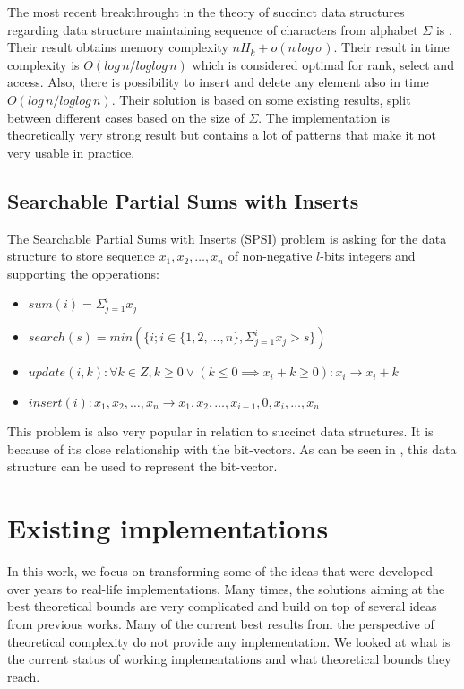 The most recent breakthrought in the theory of succinct data structures regarding data structure maintaining sequence of characters from alphabet $\Sigma$ is \cite{munro2015compressed}. Their result obtains memory complexity $nH_k+o(n\,log\,\sigma)$. Their result in time complexity is $O(log\,n/log log\,n)$ which is considered optimal for rank, select and access. Also, there is possibility to insert and delete any element also in time $O(log\,n/log log\,n)$. Their solution is based on some existing results, split between different cases based on the size of $\Sigma$. The implementation is theoretically very strong result but contains a lot of patterns that make it not very usable in practice.

\subsection{Searchable Partial Sums with Inserts}

\begin{theorem}
The Searchable Partial Sums with Inserts (SPSI) problem is asking for the data structure to
store sequence $x_1, x_2, \ldots , x_n$ of non-negative $l$-bits integers and supporting the opperations:
\begin{itemize}
    \item $sum(i) = \Sigma_{j=1}^{i} x_j$
    \item $search(s) = min(\{i; i\in \{1, 2,\ldots, n\}, \Sigma_{j=1}^{i} x_j > s \})$
    \item $update(i, k): \forall k \in Z, k \geq 0 \lor (k\leq 0 \implies x_i + k \geq 0): x_i \rightarrow x_i + k$
    \item $insert(i): x_1, x_2,\ldots, x_n \rightarrow x_1, x_2,\ldots , x_{i-1}, 0, x_{i}, \ldots , x_n$
\end{itemize}
\end{theorem}

This problem is also very popular in relation to succinct data structures. It is because of its close relationship with the bit-vectors.
As can be seen in \cite{prezza2017framework}, this data structure can be used to represent the bit-vector.

\section{Existing implementations}

In this work, we focus on transforming some of the ideas that were developed over years to real-life implementations. Many times, the solutions aiming at the best theoretical bounds are very complicated and build on top of several ideas from previous works. Many of the current best results from the perspective of theoretical complexity do not provide any implementation. We looked at what is the current status of working implementations and what theoretical bounds they reach.

